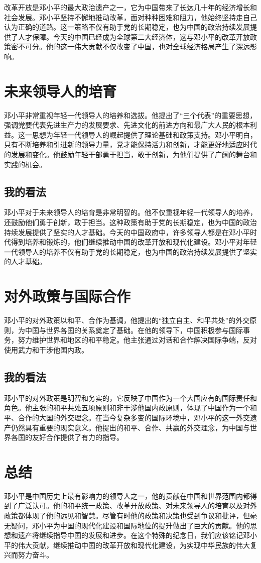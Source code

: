 \documentclass[12pt,a4paper]{article}
\begin{document}
改革开放是邓小平的最大政治遗产之一，它为中国带来了长达几十年的经济增长和社会发展。邓小平坚持不懈地推动改革，面对种种困难和阻力，他始终坚持走自己认为正确的道路。这一策略不仅有助于党的长期稳定，也为中国的政治持续发展提供了人才保障。今天的中国已经成为全球第二大经济体，这与邓小平的改革开放政策密不可分。他的这一伟大贡献不仅改变了中国，也对全球经济格局产生了深远影响。

\section{未来领导人的培育}

邓小平非常重视年轻一代领导人的培养和选拔。他提出了“三个代表”的重要思想，强调党要代表先进生产力的发展要求、先进文化的前进方向和最广大人民的根本利益。这一思想为年轻一代领导人的崛起提供了理论基础和政策支持。邓小平明白，只有不断培养和引进新的领导力量，党才能保持活力和创新，才能更好地适应时代的发展和变化。他鼓励年轻干部勇于担当，敢于创新，为他们提供了广阔的舞台和实践的机会。

\subsection{我的看法}

邓小平对于未来领导人的培育是非常明智的。他不仅重视年轻一代领导人的培养，还鼓励他们勇于创新，敢于担当。这种政策有助于党的长期稳定，也为中国的政治持续发展提供了坚实的人才基础。今天的中国政府中，许多领导人都是在邓小平时代得到培养和锻炼的，他们继续推动中国的改革开放和现代化建设。邓小平对年轻一代领导人的培养不仅有助于党的长期稳定，也为中国的政治持续发展提供了坚实的人才基础。

\section{对外政策与国际合作}

邓小平的对外政策以和平、合作为基调，他提出的“独立自主、和平共处”的外交原则，为中国与世界各国的关系奠定了基础。在他的领导下，中国积极参与国际事务，努力维护世界和地区的和平稳定。他主张通过对话和合作解决国际争端，反对使用武力和干涉他国内政。

\subsection{我的看法}

邓小平的对外政策是明智和务实的，它反映了中国作为一个大国应有的国际责任和角色。他主张的和平共处五项原则和非干涉他国内政原则，体现了中国作为一个和平、合作的大国的外交理念。在当今复杂多变的国际环境中，邓小平的这一外交遗产仍然具有重要的现实意义。他提出的和平、合作、共赢的外交理念，为中国与世界各国的友好合作提供了有力的指导。

\section{总结}

邓小平是中国历史上最有影响力的领导人之一，他的贡献在中国和世界范围内都得到了广泛认可。他的和平统一政策、改革开放政策、对未来领导人的培育以及对外政策都体现了他的远见和智慧。尽管有时他的政策和决策也受到争议和批评，但毫无疑问，邓小平为中国的现代化建设和国际地位的提升做出了巨大的贡献。他的思想和遗产将继续指导中国的发展和进步。在这个特殊的纪念日，我们应该铭记邓小平的伟大贡献，继续推动中国的改革开放和现代化建设，为实现中华民族的伟大复兴而努力奋斗。
\end{document}
